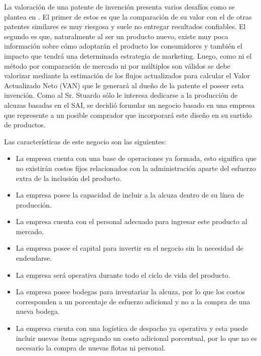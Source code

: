 La valoración de una patente de invención presenta varios desafíos como se plantea en \cite{pitkethly1997valuation}. El primer de estos es que la comparación de su valor con el de otras patentes similares es muy riesgosa y suele no entregar resultados confiables. El segundo es que, naturalmente al ser un producto nuevo, existe muy poca información sobre cómo adoptarán el producto los consumidores y también el impacto que tendrá una determinada estrategia de marketing. Luego, como ni el método por comparación de mercado ni por múltiplos son válidos se debe valorizar mediante la estimación de los flujos actualizados para calcular el Valor Actualizado Neto (VAN) que le generará al dueño de la patente el poseer esta invención. Como al Sr. Stuardo sólo le interesa dedicarse a la producción de alcuzas basadas en el SAI, se decidió formular un negocio basado en una empresa que represente a un posible comprador que incorporará este diseño en su surtido de productos.


Las características de este negocio son las siguientes:
\begin{itemize}
\item La empresa cuenta con una base de operaciones ya formada, esto significa que no existirán costos fijos relacionados con la administración aparte del esfuerzo extra de la inclusión del producto.
\item La empresa posee la capacidad de incluir a la alcuza dentro de su línea de producción.
\item La empresa cuenta con el personal adecuado para ingresar este producto al mercado.
\item La empresa posee el capital para invertir en el negocio sin la necesidad de endeudarse.
\item La empresa será operativa durante todo el ciclo de vida del producto.
\item La empresa posee bodegas para inventariar la alcuza, por lo que los costos corresponden a un porcentaje de esfuerzo adicional y no a la compra de una nueva bodega.
\item  La empresa cuenta con una logística de despacho ya operativa y esta puede incluir nuevos ítems agregando un costo adicional porcentual, por lo que no es necesario la compra de nuevas flotas ni personal.
\end{itemize}

